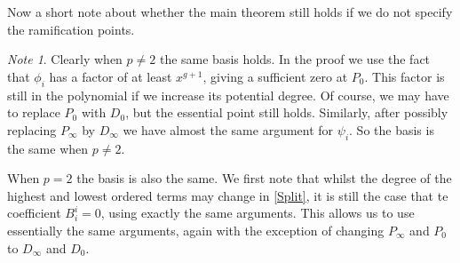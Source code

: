 \documentclass[draft, 11pt]{article} %
\theoremstyle{plain}
\theoremstyle{remark}
\newtheorem*{note}{Note}
\begin{document}
Now a short note about whether the main theorem still holds if we do not specify the ramification points.
\begin{note}
Clearly when $p\neq 2$ the same basis holds. In the proof we use the fact that $\phi_i$ has a factor of at least $x^{g+1}$, giving a sufficient zero at $P_0$.
This factor is still in the polynomial if we increase its potential degree.
Of course, we may have to replace $P_0$ with $D_0$, but the essential point still holds.
Similarly, after possibly replacing $P_\infty$ by $D_\infty$ we have almost the same argument for $\psi_i$.
So the basis is the same when $p\neq2$.

When $p=2$ the basis is also the same.
We first note that whilst the degree of the highest and lowest ordered terms may change in \eqref{Split}, it is still the case that te coefficient $B_i^i =0$, using exactly the same arguments.
This allows us to use essentially the same arguments, again with the exception of changing $P_\infty$ and $P_0$ to $D_\infty$ and $D_0$.
\end{note}





\end{document}

